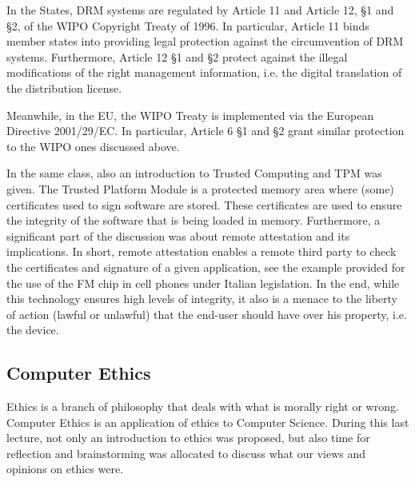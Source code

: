 In the States, DRM systems are regulated by Article 11 and Article 12, \S 1 and \S 2, of the WIPO Copyright Treaty of 1996. In particular, Article 11 binds member states into providing legal protection against the circumvention of DRM systems. Furthermore, Article 12 \S 1 and \S 2 protect against the illegal modifications of the right management information, i.e. the digital translation of the distribution license.

Meanwhile, in the EU, the WIPO Treaty is implemented via the European Directive 2001/29/EC. In particular, Article 6 \S 1 and \S 2 grant similar protection to the WIPO ones discussed above.

In the same class, also an introduction to Trusted Computing and TPM was given. The Trusted Platform Module is a protected memory area where (some) certificates used to sign software are stored. These certificates are used to ensure the integrity of the software that is being loaded in memory. Furthermore, a significant part of the discussion was about remote attestation and its implications. In short, remote attestation enables a remote third party to check the certificates and signature of a given application, see the example provided for the use of the FM chip in cell phones under Italian legislation. In the end, while this technology ensures high levels of integrity, it also is a menace to the liberty of action (lawful or unlawful) that the end-user should have over his property, i.e. the device.

\subsection*{Computer Ethics}

Ethics is a branch of philosophy that deals with what is morally right or wrong. Computer Ethics is an application of ethics to Computer Science. During this last lecture, not only an introduction to ethics was proposed, but also time for reflection and brainstorming was allocated to discuss what our views and opinions on ethics were. 